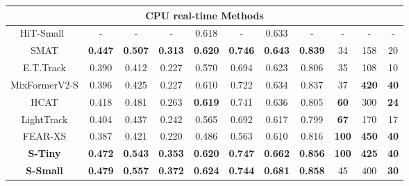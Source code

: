\begin{table}
{\begin{tabular}{c |c c  c  |c c  |c c |c c c}
	\hline
	\multicolumn{11}{c}{CPU real-time Methods} \\
	\hline  
	
	HiT-Small~\cite{kang2023exploring} & - & - & - &  0.618 & - & 0.633 & - & - & - & -\\
	SMAT \cite{gopal2024separable} & \color{ForestGreen} \bf{0.447} & \color{ForestGreen} \bf{0.507} & \color{ForestGreen} \bf{0.313}  &  \color{RoyalBlue} \bf{0.620}  &  \color{RoyalBlue} \bf{0.746} & \color{ForestGreen} \bf{0.643}  & \color{ForestGreen} \bf{0.839} & 34 & 158 & 20 \\
	E.T.Track \cite{blatter2023efficient} & 0.390 & 0.412 & 0.227               & 0.570  & 0.694 & 0.623  & 0.806 & 35 & 108 & 10 \\
	MixFormerV2-S \cite{cui2024mixformerv2} & 0.396 & 0.425 & 0.227             & 0.610  & 0.722 & 0.634  & 0.837 & 37 & \color{ForestGreen} \bf{420} & \color{Mahogany} \bf{40} \\
	HCAT \cite{chen2022efficient} & 0.418 & 0.481 & 0.263                       & \color{ForestGreen} \bf{0.619}  & 0.741 & 0.636  & 0.805 & \color{ForestGreen} \bf{60} & 300 & \color{ForestGreen} \bf{24} \\
	LightTrack \cite{yan2021lighttrack} & 0.404 & 0.437 & 0.242                 & 0.565  & 0.692 & 0.617  & 0.799 & \color{RoyalBlue} \bf{67} & 170 & 17 \\
	FEAR-XS \cite{borsuk2022fear} & 0.387 & 0.421 & 0.220                       & 0.486  & 0.563 & 0.610  & 0.816 &  \color{Mahogany} \bf{100} & \color{Mahogany} \bf{450} & \color{Mahogany} \bf{40}\\
  
	
	\rowcolor{lightgray!20} \bf{S-Tiny}  &  \color{RoyalBlue} \bf{0.472} &  \color{RoyalBlue} \bf{0.543} &  \color{RoyalBlue} \bf{0.353}  &  \color{RoyalBlue} \bf{0.620}  &  \color{Mahogany} \bf{0.747} &  \color{RoyalBlue} \bf{0.662} &  \color{RoyalBlue} \bf{0.856} &  \color{Mahogany} \bf{100} & \color{RoyalBlue} \bf{425} & \color{Mahogany} \bf{40}\\
	\rowcolor{lightgray!20} \bf{S-Small} &  \color{Mahogany} \bf{0.479} &  \color{Mahogany} \bf{0.557} &  \color{Mahogany} \bf{0.372}  &  \color{Mahogany} \bf{0.624}  & \color{ForestGreen} \bf{0.744} &  \color{Mahogany} \bf{0.681}  &  \color{Mahogany} \bf{0.858} &  45 & 400 & \color{RoyalBlue} \bf{30}\\
	\hline
	\end{tabular}
	}
  \end{table}

